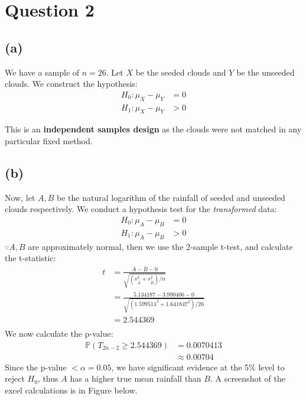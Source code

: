 \documentclass[12pt]{article}
\begin{document}
\section*{Question 2}

\subsection*{(a)}

We have a sample of $n = 26$. Let $X$ be the seeded clouds and $Y$ be the unseeded clouds. We construct the hypothesis: \begin{align*}
    H_{0} : \mu_X - \mu_Y &= 0 \\ 
    H_{1} : \mu_X - \mu_Y &> 0 
\end{align*}

\noindent This is an \textbf{independent samples design} as the clouds were not matched in any particular fixed method. 

\subsection*{(b)}

Now, let $A, B$ be the natural logarithm of the rainfall of seeded and unseeded clouds respectively. We conduct a hypothesis test for the \textit{transformed} data: \begin{align*}
    H_{0} : \mu_A - \mu_B &= 0 \\ 
    H_{1} : \mu_A - \mu_B &> 0
\end{align*} $\because A, B$ are approximately normal, then we use the 2-sample t-test, and calculate the t-statistic: \begin{align*}
    t &= \frac{\bar{A} - \bar{B} - 0}{\sqrt{(s_{\bar{A}}^{2} + s_{\bar{B}}^{2}) / n}} \\ 
    &= \frac{5.134187 - 3.990406 - 0}{\sqrt{(1.599514^{2} + 1.641847^{2}) / 26}} \\
    &= 2.544369 \\ 
\end{align*} We now calculate the p-value: \begin{align*}
    \mathbb{P}(T_{2n-2} \geq 2.544369) &= 0.0070413 \\ 
    &\approx \boxed{0.00704}
\end{align*} Since the p-value $< \alpha = 0.05$, we have significant evidence at the 5\% level to reject $H_{0}$, thus $A$ has a higher true mean rainfall than $B$. A screenshot of the excel calculations is in Figure below. 
\end{document}
